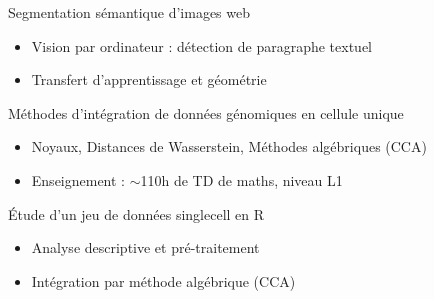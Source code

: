 \documentclass[10pt,a4paper]{fonteCV}
\begin{document}




\begin{fullwidth}
\makecvheader
\end{fullwidth}





Segmentation sémantique d'images web
\smallskip
\begin{itemize}
\item Vision par ordinateur : détection de paragraphe textuel 
\item Transfert d'apprentissage et géométrie
\end{itemize}

\divider


Méthodes d'intégration de données génomiques en cellule unique
\smallskip
\begin{itemize}
\item Noyaux, Distances de Wasserstein, Méthodes algébriques (CCA)
\item Enseignement : $\sim$110h de TD de maths, niveau L1
\end{itemize}

\divider

\'Etude d'un jeu de données singlecell en R
\smallskip%
\begin{itemize}
\item Analyse descriptive et pr\'e-traitement 
\item Intégration par méthode algébrique (CCA) 
\end{itemize}
\smallskip
\end{document}

